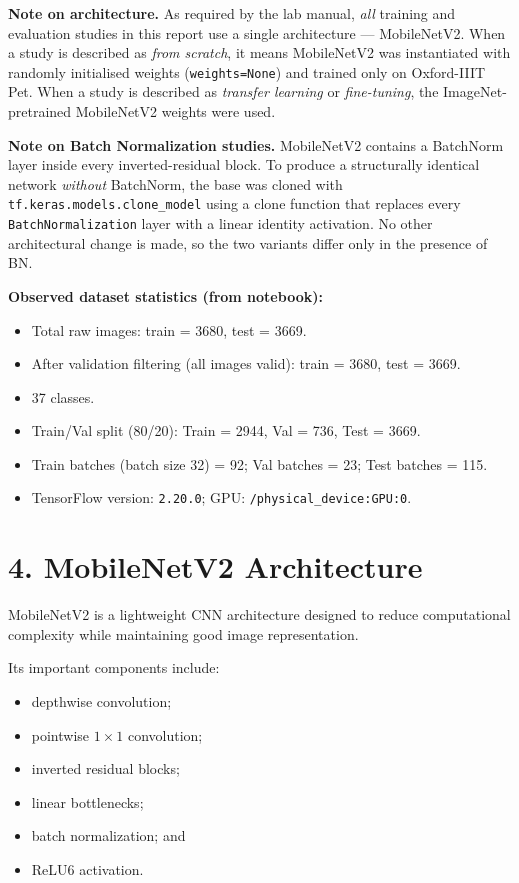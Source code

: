 \documentclass[10pt]{article}
\begin{document}
\textbf{Note on architecture.} As required by the lab manual, \emph{all}
training and evaluation studies in this report use a single architecture
--- MobileNetV2. When a study is described as \emph{from scratch}, it
means MobileNetV2 was instantiated with randomly initialised weights
(\texttt{weights=None}) and trained only on Oxford-IIIT Pet. When a
study is described as \emph{transfer learning} or \emph{fine-tuning},
the ImageNet-pretrained MobileNetV2 weights were used.

\textbf{Note on Batch Normalization studies.} MobileNetV2 contains a
BatchNorm layer inside every inverted-residual block. To produce a
structurally identical network \emph{without} BatchNorm, the base was
cloned with \texttt{tf.keras.models.clone\_model} using a clone
function that replaces every \texttt{BatchNormalization} layer with a
linear identity activation. No other architectural change is made, so
the two variants differ only in the presence of BN.

\textbf{Observed dataset statistics (from notebook):}
\begin{itemize}
\item Total raw images: train = 3680, test = 3669.
\item After validation filtering (all images valid): train = 3680, test = 3669.
\item 37 classes.
\item Train/Val split (80/20): Train = 2944, Val = 736, Test = 3669.
\item Train batches (batch size 32) = 92; Val batches = 23; Test batches = 115.
\item TensorFlow version: \texttt{2.20.0}; GPU: \texttt{/physical\_device:GPU:0}.
\end{itemize}

\section*{4. MobileNetV2 Architecture}
MobileNetV2 is a lightweight CNN architecture designed to reduce
computational complexity while maintaining good image representation.

Its important components include:
\begin{itemize}
\item depthwise convolution;
\item pointwise $1\times1$ convolution;
\item inverted residual blocks;
\item linear bottlenecks;
\item batch normalization; and
\item ReLU6 activation.
\end{itemize}
\end{document}

